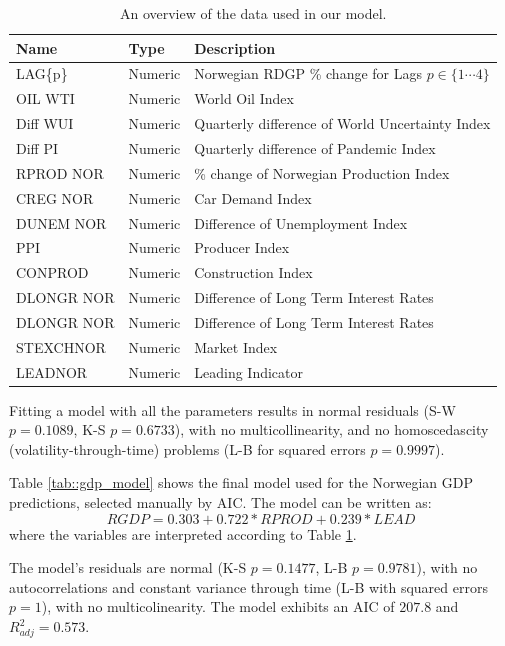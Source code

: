 \documentclass[11pt, a4paper]{article}
\begin{document}
	\begin{table}
		\centering
		\begin{tabular}
			{ |p{3cm} | p{3cm} | p{5cm}| }
			\hline
			\textbf{Name} & \textbf{Type} & \textbf{Description} \\
			\hline
			LAG\{p\}  & Numeric & Norwegian RDGP \% change for  Lags $p \in \{1 \cdots 4\}$\\
			OIL WTI  & Numeric & World Oil Index \\
			Diff WUI  & Numeric & Quarterly difference of World Uncertainty Index \\
			Diff PI & Numeric & Quarterly difference of Pandemic Index \\
			RPROD NOR  & Numeric & \% change of Norwegian Production Index \\
			CREG NOR  & Numeric & Car Demand Index \\
			DUNEM NOR  & Numeric & Difference of Unemployment Index \\
			PPI  & Numeric & Producer Index \\
			CONPROD  & Numeric & Construction Index \\
			DLONGR NOR  & Numeric & Difference of Long Term Interest Rates\\
			DLONGR NOR  & Numeric & Difference of Long Term Interest Rates\\
			STEXCHNOR & Numeric & Market Index \\
			LEADNOR & Numeric & Leading Indicator \\
			\hline
		\end{tabular}
		\caption{An overview of the data used in our model.}
		\label{tab::params}
	\end{table}
	
	Fitting a model with all the parameters results in normal residuals (S-W $p = 0.1089$, K-S $p=0.6733$), with no multicollinearity, and no homoscedascity (volatility-through-time) problems (L-B for squared errors $p=0.9997$).
	
	Table \ref{tab::gdp_model} shows the final model used for the Norwegian GDP predictions, selected manually by AIC. The model can be written as:
	$$
	RGDP = 0.303 + 0.722 * RPROD + 0.239 * LEAD
	$$
	where the variables are interpreted according to Table \ref{tab::params}.
	
	The model's residuals are normal (K-S $p=0.1477$, L-B $p=0.9781$), with no autocorrelations and constant variance through time (L-B with squared errors $p=1$), with no multicolinearity. The model exhibits an AIC of $207.8$ and $R^2_{adj} = 0.573$.
	
\end{document}
